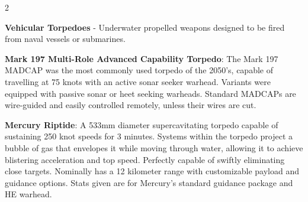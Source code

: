 \documentclass[
  oneside]{article}
\begin{document}
\begin{multicols}{2}

\textbf{Vehicular Torpedoes} - Underwater
propelled weapons designed to be fired from naval
vessels or submarines.

\textbf{Mark 197 Multi-Role Advanced Capability
Torpedo}: The Mark 197 MADCAP was the most
commonly used torpedo of the 2050's, capable of
travelling at 75 knots with an active sonar seeker
warhead. Variants were equipped with passive sonar
or heet seeking warheads. Standard MADCAPs are
wire-guided and easily controlled remotely, unless
their wires are cut.

\textbf{Mercury Riptide}: A 533mm diameter
supercavitating torpedo capable of sustaining 250
knot speeds for 3 minutes. Systems within the
torpedo project a bubble of gas that envelopes it
while moving through water, allowing it to achieve
blistering acceleration and top speed. Perfectly
capable of swiftly eliminating close targets.
Nominally has a 12 kilometer range with
customizable payload and guidance options. Stats
given are for Mercury's standard guidance package
and HE warhead.

\end{multicols}
\end{document}
